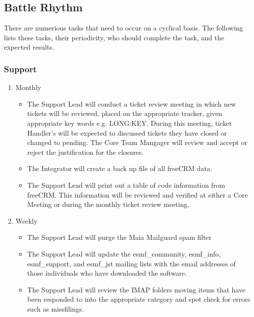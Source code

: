 \subsection{Battle Rhythm}
There are numerious tasks that need to occur on a cyclical basis. The following lists these tasks, their periodicity, who should complete the task, and the expected results.

\subsubsection{Support}
\begin{enumerate}
\item Monthly
  \begin{itemize}
  \item The Support Lead will conduct a ticket review meeting in which new tickets will be reviewed, placed on the appropriate tracker, given appropriate key words e.g. LONG:KEY. During this meeting, ticket Handler's will be expected to discussed tickets they have closed or changed to pending. The Core Team Mangager will review and accept or reject the justification for the closures.
   \item The Integrator will create a back up file of all freeCRM data.
   \item The Support Lead will print out a table of code information from freeCRM. This information will be reviewed and verified at either a Core Meeting or during the monthly ticket review meeting. 
  \end{itemize}

\item Weekly
  \begin{itemize}
  \item The Support Lead will purge the Maia Mailguard spam filter
  \item The Support Lead will update the esmf\_community, esmf\_info, esmf\_support, and esmf\_jst mailing lists with the email addresses of those individuals who have downloaded the software.
  \item The Support Lead will review the IMAP folders moving items that have been responded to into the appropriate category and spot check for errors such as missfilings.
  \end{itemize}

\end{enumerate}  
 
